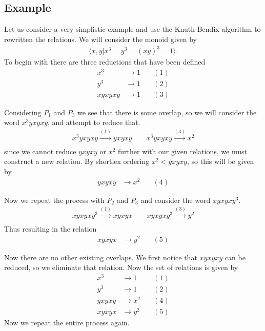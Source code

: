 \documentclass[10pt]{amsart}
\theoremstyle{definition}
\theoremstyle{remark}
\begin{document}
\subsection{Example}%
\label{sub:example}

Let us consider a very simplistic example and use the Knuth-Bendix algorithm to
rewritten the relations. We will consider the monoid given by
\begin{align*}
  \langle x,y\vert x^3=y^3={(xy)}^3=1\rangle.
\end{align*}
To begin with there are three reductions that have been defined
\begin{align*}
  x^3&\rightarrow1\quad&(1)\\
  y^3&\rightarrow1\quad&(2)\\
  xyxyxy&\rightarrow1\quad&(3)
\end{align*}

Considering $P_1$ and $P_3$ we see that there is some overlap, so we will
consider the word $x^3yxyxy$, and attempt to reduce that.
\begin{align*}
  x^3yxyxy\xrightarrow{(1)}yxyxy\quad\quad
  x^3yxyxy\xrightarrow{(3)}x^2\\
\end{align*}
since we cannot reduce $yxyxy$ or $x^2$ further with our given relations, we
must construct a new relation. By shortlex ordering $x^2<yxyxy$, so this will
be given by
\begin{align*}
  yxyxy&\rightarrow x^2\quad&(4)
\end{align*}

Now we repeat the process with $P_2$ and $P_3$ and consider the word
$xyxyxy^3$.
\begin{align*}
  xyxyxy^3\xrightarrow{(1)}xyxyx\quad\quad
  xyxyxy^3\xrightarrow{(3)}y^2\\
\end{align*}
Thus resulting in the relation
\begin{align*}
  xyxyx&\rightarrow y^2\quad&(5)
\end{align*}

Now there are no other existing overlaps. We first notice that $xyxyxy$ can be
reduced, so we eliminate that relation. Now the set of relations is given by
\begin{align*}
  x^3&\rightarrow1\quad&(1)\\
  y^3&\rightarrow1\quad&(2)\\
  yxyxy&\rightarrow x^2\quad&(4)\\
  xyxyx&\rightarrow y^2\quad&(5)
\end{align*}
Now we repeat the entire process again.
\end{document}
